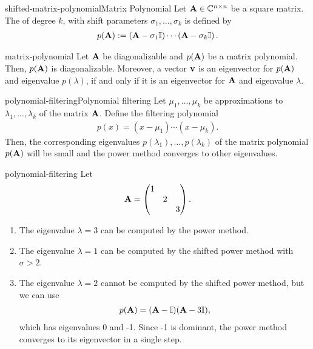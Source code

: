 
\begin{Definition*}{shifted-matrix-polynomial}{Matrix Polynomial}
  Let \(\mathbf A \in \mathbb C^{n \times n}\) be a square matrix.
  The  of degree \(k\), with shift parameters \(\sigma_1, \ldots, \sigma_k\) is defined by
  \begin{gather}
    p(\mathbf A) := \left(\mathbf A - \sigma_1 \mathbb I \right) \cdots \left(\mathbf A - \sigma_k \mathbb I \right).
  \end{gather}
\end{Definition*}

\begin{Lemma}{matrix-polynomial}
  Let $\mathbf A$ be diagonalizable and $p(\mathbf A)$ be a matrix
  polynomial. Then, $p(\mathbf A)$ is diagonalizable. Moreover, a vector
  $\mathbf v$ is an eigenvector for $p(\mathbf A)$ and eigenvalue $p(\lambda)$,
  if and only if it is an eigenvector for $\mathbf A$ and eigenvalue $\lambda$.
\end{Lemma}

\begin{Lemma*}{polynomial-filtering}{Polynomial filtering}
  Let $\mu_1,\dots,\mu_k$ be approximations to  $\lambda_1,\dots,\lambda_k$ of the matrix
  $\mathbf A$. Define the filtering polynomial
  \begin{gather}
    p(x) = (x-\mu_1)\cdots(x-\mu_k).
  \end{gather}
  Then, the corresponding eigenvalues
  $p(\lambda_1),\dots,p(\lambda_k)$ of the matrix polynomial
  $p(\mathbf A)$ will be small and the power method converges to other
  eigenvalues.
\end{Lemma*}

\begin{Example}{polynomial-filtering}
  Let
  \begin{gather}
    \mathbf A =
    \begin{pmatrix}
      1&&\\ &2& \\ &&3
    \end{pmatrix}.
  \end{gather}
  \begin{enumerate}
  \item The eigenvalue $\lambda=3$ can be computed by the power method.
  \item The eigenvalue $\lambda=1$ can be computed by the shifted power method with $\sigma>2$.
  \item The eigenvalue $\lambda=2$ cannot be computed by the shifted power method, but we can use
    \begin{gather}
      p(\mathbf A) = (\mathbf A-\mathbb I)(\mathbf A-3\mathbb I),
    \end{gather}
    which has eigenvalues 0 and -1. Since -1 is dominant, the power
    method converges to its eigenvector in a single step.
  \end{enumerate}
\end{Example}

